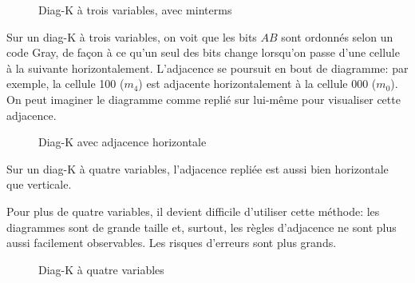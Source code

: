 \documentclass[letter, oneside]{book}
\begin{document}
\begin{figure}[htbp]
\centering

\caption{\label{fig:org818d05b}Diag-K à trois variables, avec minterms}
\end{figure}

Sur un diag-K à trois variables, on voit que les bits \(AB\) sont
ordonnés selon un code Gray, de façon à ce qu'un seul des bits change
lorsqu'on passe d'une cellule à la suivante
horizontalement. L'adjacence se poursuit en bout de diagramme: par
exemple, la cellule 100 (\(m_4\)) est adjacente horizontalement à la
cellule 000 (\(m_0\)). On peut imaginer le diagramme comme replié sur
lui-même pour visualiser cette adjacence.

\begin{figure}[htbp]
\centering

\caption{\label{fig:org472a194}Diag-K avec adjacence horizontale}
\end{figure}

Sur un diag-K à quatre variables, l'adjacence repliée est aussi bien horizontale
que verticale.

Pour plus de quatre variables, il devient difficile d'utiliser cette
méthode: les diagrammes sont de grande taille et, surtout, les règles
d'adjacence ne sont plus aussi facilement observables. Les risques
d'erreurs sont plus grands.

\begin{figure}[htbp]
\centering

\caption{\label{fig:org9a82d03}Diag-K à quatre variables}
\end{figure}
\end{document}
